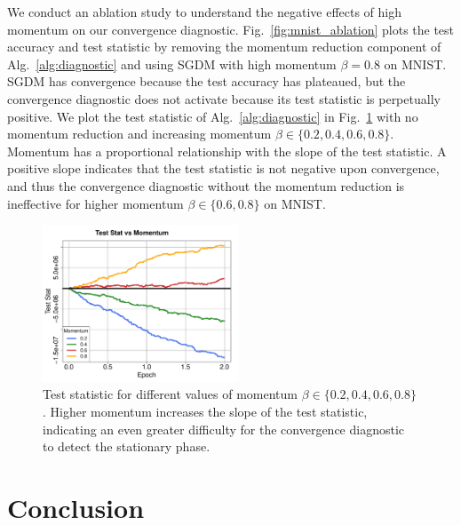\documentclass[conference]{IEEEtran}
\begin{document}
We conduct an ablation study to understand the negative effects of high momentum on our convergence diagnostic.
Fig.~\ref{fig:mnist_ablation} plots the test accuracy and test statistic by removing the momentum reduction component of Alg.~\ref{alg:diagnostic} and using SGDM with high momentum $\beta = 0.8$ on MNIST. 
SGDM has convergence because the test accuracy has plateaued, but the convergence diagnostic does not activate because its test statistic is perpetually positive.
We plot the test statistic of Alg.~\ref{alg:diagnostic} in Fig.~\ref{fig:mnist_ablation2} with no momentum reduction and increasing momentum $\beta \in \{0.2, 0.4, 0.6, 0.8\}$.
Momentum has a proportional relationship with the slope of the test statistic. 
A positive slope indicates that the test statistic is not negative upon convergence, and thus the convergence diagnostic without the momentum reduction is ineffective for higher momentum $\beta \in\{ 0.6, 0.8\}$ on MNIST.



\begin{figure}[h!]
\begin{center}
\includegraphics[width=2.3in]{fig/RFig8_IPMom.pdf}
\end{center}
\vspace{-0.15in}
  \caption{
  Test statistic for different values of momentum $\beta \in \{0.2, 0.4, 0.6, 0.8\}$. 
  Higher momentum increases the slope of the test statistic, indicating an even greater difficulty for the convergence diagnostic to detect the stationary phase.
  }
\label{fig:mnist_ablation2}
\end{figure}

\section{Conclusion}
\end{document}
